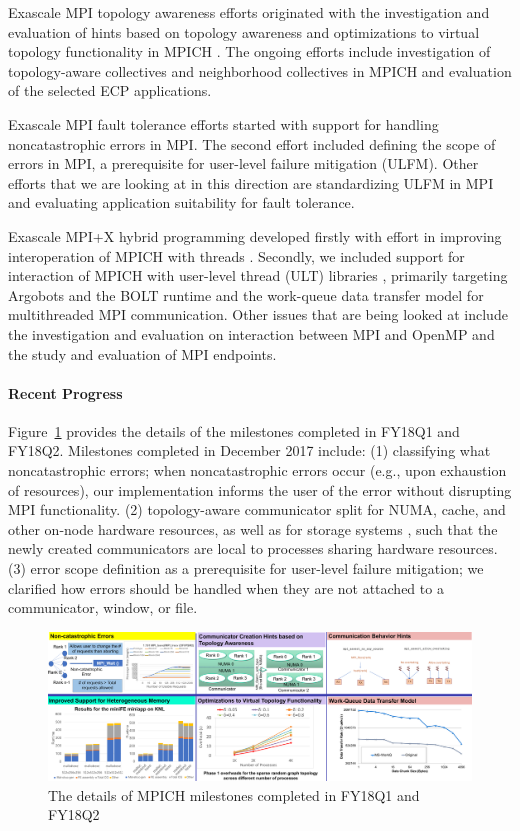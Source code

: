 Exascale MPI topology awareness efforts \cite{Topo1,Topo2} originated
with the investigation and evaluation of hints based on topology
awareness and optimizations to virtual topology functionality in MPICH
\cite{topo-io,topo-io2}.  The ongoing efforts include investigation of
topology-aware collectives and neighborhood collectives in MPICH
\cite{coll} and evaluation of the selected ECP applications.

Exascale MPI fault tolerance efforts \cite{FT1, FT2} started with
support for handling noncatastrophic errors in MPI.  The second effort
included defining the scope of errors in MPI, a prerequisite for
user-level failure mitigation (ULFM).  Other efforts that we are
looking at in this direction are standardizing ULFM in MPI and
evaluating application suitability for fault tolerance.

Exascale MPI+X hybrid programming developed firstly with effort in
improving interoperation of MPICH with threads \cite{interthread}.
Secondly, we included support for interaction of MPICH with user-level
thread (ULT) libraries \cite{ULT}, primarily targeting Argobots and
the BOLT runtime and the work-queue data transfer model for
multithreaded MPI communication.  Other issues that are being looked
at include the investigation and evaluation on interaction between MPI
and OpenMP and the study and evaluation of MPI endpoints.


\paragraph{Recent Progress}

Figure~\ref{fig:march18} provides the details of the milestones
completed in FY18Q1 and FY18Q2.  Milestones completed in December 2017
include: (1) classifying what noncatastrophic errors; when
noncatastrophic errors occur (e.g., upon exhaustion of resources), our
implementation informs the user of the error without disrupting MPI
functionality.  (2) topology-aware communicator split for NUMA, cache,
and other on-node hardware resources, as well as for storage systems
\cite{topo-io,topo-io2}, such that the newly created communicators are
local to processes sharing hardware resources.  (3) error scope
definition as a prerequisite for user-level failure mitigation; we
clarified how errors should be handled when they are not attached to a
communicator, window, or file.

\begin{figure}[htb]
  \centering
  \includegraphics[width=6in]{projects/2.3.1-PMR/2.3.1.07-Exascale-MPI/MPICH-recent-milestones.pdf}
  \caption{\label{fig:march18}The details of MPICH milestones
    completed in FY18Q1 and FY18Q2}
\end{figure}

